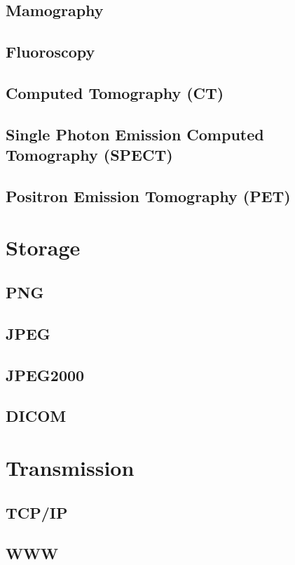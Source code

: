 \documentclass{report}%
\begin{document}
\section{Mamography}


\section{Fluoroscopy}


\section{Computed Tomography (CT)}


\section{Single Photon Emission Computed Tomography (SPECT)}


\section{Positron Emission Tomography (PET)}


\chapter{Storage}

\section{PNG}
\section{JPEG}
\section{JPEG2000}
\section{DICOM}

\chapter{Transmission}

\section{TCP/IP}
\section{WWW}
\end{document}
